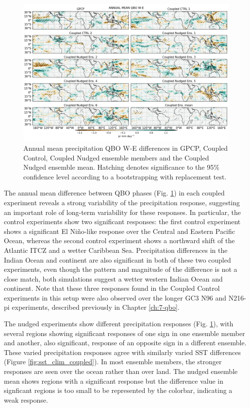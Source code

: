 \begin{figure}[t!]
\centering
 \includegraphics[width=\linewidth]{figures/pr_check_climqbowqboe.png}
\caption[Precipitation response to the QBO in coupled nudged experiments]{ Annual mean precipitation QBO W-E differences in GPCP, Coupled Control, Coupled Nudged ensemble members and the Coupled Nudged ensemble mean. Hatching denotes significance to the 95\% confidence level according to a bootstrapping with replacement test.}
\label{fig:pr_clim_coupled}
\end{figure}


The annual mean difference between QBO phases (Fig. \ref{fig:pr_clim_coupled}) in each coupled experiment reveals a strong variability of the precipitation response, suggesting an important role of long-term variability for these responses. 
In particular, the control experiments show two significant responses: the first control experiment shows a significant El Niño-like response over the Central and Eastern Pacific Ocean, whereas the second control experiment shows a northward shift of the Atlantic ITCZ and a wetter Caribbean Sea.
Precipitation differences in the Indian Ocean and continent are also significant in both of these two coupled experiments, even though the pattern and magnitude of the difference is not a close match, both simulations suggest a wetter western Indian Ocean and continent. 
Note that these three responses found in the Coupled Control experiments in this setup were also observed over the longer GC3 N96 and N216-pi experiments, described previously in Chapter \ref{ch:7-qbo}.

The nudged experiments show different precipitation responses (Fig. \ref{fig:pr_clim_coupled}), with several regions showing significant responses of one sign in one ensemble member and another, also significant, response of an opposite sign in a different ensemble. These varied precipitation responses agree with similarly varied SST differences (Figure \ref{fig:sst_clim_coupled}). In most ensemble members, the stronger responses are seen over the ocean rather than over land.
The nudged ensemble mean shows regions with a significant response but the difference value in signficant regions is too small to be represented by the colorbar, indicating a weak response. 

